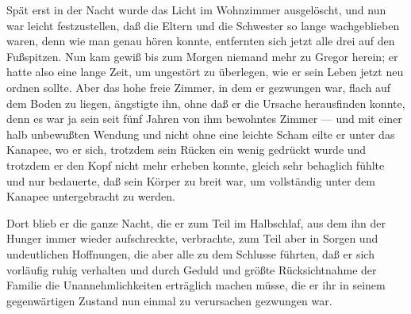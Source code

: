 Spät erst in der Nacht wurde das Licht im Wohnzimmer ausgelöscht, und
nun war leicht festzustellen, daß die Eltern und die Schwester so lange
wachgeblieben waren, denn wie man genau hören konnte, entfernten sich
jetzt alle drei auf den Fußspitzen. Nun kam gewiß bis zum Morgen niemand
mehr zu Gregor herein; er hatte also eine lange Zeit, um ungestört zu
überlegen, wie er sein Leben jetzt neu ordnen sollte. Aber das hohe
freie Zimmer, in dem er gezwungen war, flach auf dem Boden zu liegen,
ängstigte ihn, ohne daß er die Ursache herausfinden konnte, denn es war
ja sein seit fünf Jahren von ihm bewohntes Zimmer --- und mit einer halb
unbewußten Wendung und nicht ohne eine leichte Scham eilte er unter das
Kanapee, wo er sich, trotzdem sein Rücken ein wenig gedrückt wurde und
trotzdem er den Kopf nicht mehr erheben konnte, gleich sehr behaglich
fühlte und nur bedauerte, daß sein Körper zu breit war, um vollständig
unter dem Kanapee untergebracht zu werden.

Dort blieb er die ganze Nacht, die er zum Teil im Halbschlaf, aus dem
ihn der Hunger immer wieder aufschreckte, verbrachte, zum Teil aber in
Sorgen und undeutlichen Hoffnungen, die aber alle zu dem Schlusse
führten, daß er sich vorläufig ruhig verhalten und durch Geduld und
größte Rücksichtnahme der Familie die Unannehmlichkeiten erträglich
machen müsse, die er ihr in seinem gegenwärtigen Zustand nun einmal zu
verursachen gezwungen war.

